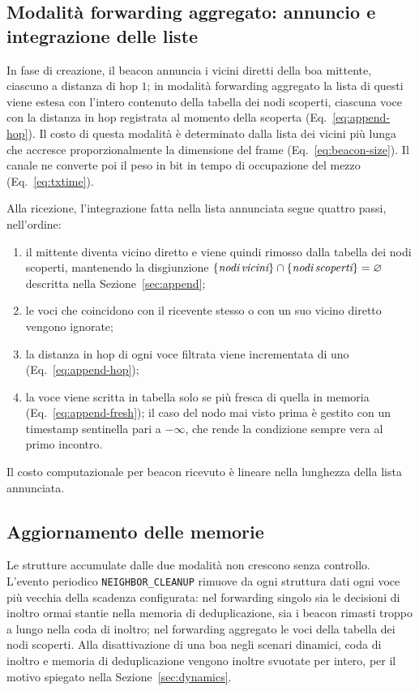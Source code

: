 \subsection{Modalit\`a forwarding aggregato: annuncio e integrazione delle liste}
\label{sec:append-impl}
In fase di creazione, il beacon annuncia i vicini diretti della boa mittente, ciascuno a
distanza di hop $1$; in modalit\`a forwarding aggregato la lista di questi viene estesa con l'intero contenuto
della tabella dei nodi scoperti, ciascuna voce con la distanza in hop registrata al
momento della scoperta (Eq.~\ref{eq:append-hop}). Il costo di questa modalit\`a \`e determinato
dalla lista dei vicini pi\`u lunga che accresce proporzionalmente la dimensione del frame (Eq.~\ref{eq:beacon-size}).
Il canale ne converte poi il peso in bit
in tempo di occupazione del mezzo (Eq.~\ref{eq:txtime}).

Alla ricezione, l'integrazione fatta nella lista annunciata
segue quattro passi, nell'ordine:
\begin{enumerate}[leftmargin=1.6em,nosep]
  \item il mittente diventa vicino diretto e viene quindi rimosso dalla
  tabella dei nodi scoperti, mantenendo la
  disgiunzione $\{\emph{nodi\,vicini}\}\cap\{\emph{nodi\,scoperti}\} = \varnothing$
  descritta nella Sezione~\ref{sec:append};
  \item le voci che coincidono con il ricevente stesso o con un suo vicino diretto
  vengono ignorate;
  \item la distanza in hop di ogni voce filtrata viene incrementata di uno
  (Eq.~\ref{eq:append-hop});
  \item la voce viene scritta in tabella solo se pi\`u fresca di quella in memoria
  (Eq.~\ref{eq:append-fresh}); il caso del nodo mai visto prima \`e gestito con un
  timestamp sentinella pari a $-\infty$, che rende la condizione sempre
  vera al primo incontro.
\end{enumerate}
Il costo computazionale per beacon ricevuto \`e lineare nella lunghezza della lista
annunciata.

\subsection{Aggiornamento delle memorie}
\label{sec:multihop-cleanup}
Le strutture accumulate dalle due modalit\`a non crescono senza controllo. L'evento
periodico \texttt{NEIGHBOR\_CLEANUP} rimuove da ogni struttura dati ogni voce pi\`u vecchia della scadenza configurata:
nel forwarding singolo sia le decisioni di inoltro ormai stantie nella memoria di deduplicazione,
sia i beacon rimasti troppo a lungo nella coda di inoltro; nel forwarding aggregato le voci della tabella dei nodi scoperti.
Alla disattivazione di una boa negli scenari dinamici, coda di inoltro e memoria di
deduplicazione vengono inoltre svuotate per intero, per il motivo spiegato nella Sezione~\ref{sec:dynamics}.

